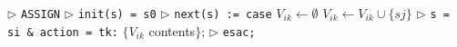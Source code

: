 \documentclass{report}
\begin{document}
\begin{algorithmic}
\State $\triangleright$ \verb!ASSIGN!
\State $\triangleright$ \verb!init(s) = s0!
\State $\triangleright$ \verb!next(s) := case!
   		\State $V_{ik} \gets \emptyset$ 
   				\State $V_{ik} \gets V_{ik} \cup\{sj\}$
   			\EndIf
   		\EndFor
   		\State $\triangleright$ \verb!s = si & action = tk:! $\{V_{ik}$ contents$\}$;
   \EndFor
\EndFor
\State $\triangleright$ \verb!esac;!
\end{algorithmic}
\end{document}
